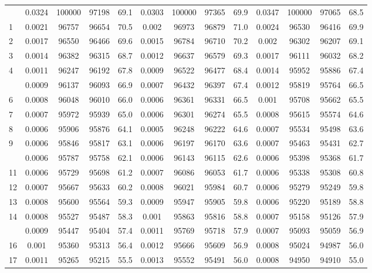 \documentclass[
  14pt,
]{article}
\begin{document}
\begin{longtable}[t]{lcccccccccccc}
\endfoot
\bottomrule
\endlastfoot
0 & 0.0324 & 100000 & 97198 & 69.1 & 0.0303 & 100000 & 97365 & 69.9 & 0.0347 & 100000 & 97065 & 68.5\\
1 & 0.0021 & 96757 & 96654 & 70.5 & 0.002 & 96973 & 96879 & 71.0 & 0.0024 & 96530 & 96416 & 69.9\\
2 & 0.0017 & 96550 & 96466 & 69.6 & 0.0015 & 96784 & 96710 & 70.2 & 0.002 & 96302 & 96207 & 69.1\\
3 & 0.0014 & 96382 & 96315 & 68.7 & 0.0012 & 96637 & 96579 & 69.3 & 0.0017 & 96111 & 96032 & 68.2\\
4 & 0.0011 & 96247 & 96192 & 67.8 & 0.0009 & 96522 & 96477 & 68.4 & 0.0014 & 95952 & 95886 & 67.4\\
\addlinespace
5 & 0.0009 & 96137 & 96093 & 66.9 & 0.0007 & 96432 & 96397 & 67.4 & 0.0012 & 95819 & 95764 & 66.5\\
6 & 0.0008 & 96048 & 96010 & 66.0 & 0.0006 & 96361 & 96331 & 66.5 & 0.001 & 95708 & 95662 & 65.5\\
7 & 0.0007 & 95972 & 95939 & 65.0 & 0.0006 & 96301 & 96274 & 65.5 & 0.0008 & 95615 & 95574 & 64.6\\
8 & 0.0006 & 95906 & 95876 & 64.1 & 0.0005 & 96248 & 96222 & 64.6 & 0.0007 & 95534 & 95498 & 63.6\\
9 & 0.0006 & 95846 & 95817 & 63.1 & 0.0006 & 96197 & 96170 & 63.6 & 0.0007 & 95463 & 95431 & 62.7\\
\addlinespace
10 & 0.0006 & 95787 & 95758 & 62.1 & 0.0006 & 96143 & 96115 & 62.6 & 0.0006 & 95398 & 95368 & 61.7\\
11 & 0.0006 & 95729 & 95698 & 61.2 & 0.0007 & 96086 & 96053 & 61.7 & 0.0006 & 95338 & 95308 & 60.8\\
12 & 0.0007 & 95667 & 95633 & 60.2 & 0.0008 & 96021 & 95984 & 60.7 & 0.0006 & 95279 & 95249 & 59.8\\
13 & 0.0008 & 95600 & 95564 & 59.3 & 0.0009 & 95947 & 95905 & 59.8 & 0.0006 & 95220 & 95189 & 58.8\\
14 & 0.0008 & 95527 & 95487 & 58.3 & 0.001 & 95863 & 95816 & 58.8 & 0.0007 & 95158 & 95126 & 57.9\\
\addlinespace
15 & 0.0009 & 95447 & 95404 & 57.4 & 0.0011 & 95769 & 95718 & 57.9 & 0.0007 & 95093 & 95059 & 56.9\\
16 & 0.001 & 95360 & 95313 & 56.4 & 0.0012 & 95666 & 95609 & 56.9 & 0.0008 & 95024 & 94987 & 56.0\\
17 & 0.0011 & 95265 & 95215 & 55.5 & 0.0013 & 95552 & 95491 & 56.0 & 0.0008 & 94950 & 94910 & 55.0\\

\end{longtable}
\end{document}

